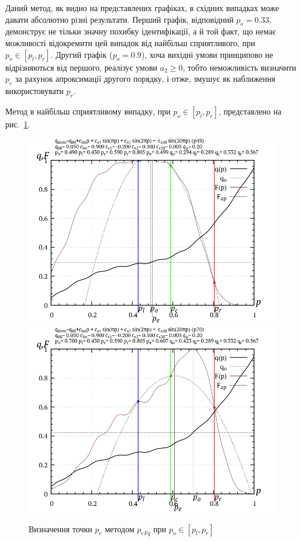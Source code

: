 Даний метод, як видно на представлених графіках, в східних
випадках може давати абсолютно різні результати. Перший графік,
відповідний
$p_o = 0.33$, демонструє не тільки значну похибку ідентифікації,
а й той факт, що немає можливості відокремити цей випадок від
найбільш сприятливого, при
$p_o \in [p_l, p_r]$. Другий графік ($p_o = 0.9$),
хоча вихідні умови принципово не відрізняються від
першого, реалізує умови
$a_2 \ge 0$, тобто неможливість визначити
$p_e$ за рахунок апроксимації другого порядку, і отже, змушує як
наближення використовувати
$p_r$.

Метод в найбільш сприятливому випадку, при
$p_o \in [p_l,p_r]$, представлено на рис.~\ref{atu:f:p_eFq_intra}.


\begin{figure}[htb!]
  \begin{center}
    \includegraphics[width=49\TW]{p/p_eFq/q_p_eFq_p49.png}
    \hfill
    \includegraphics[width=49\TW]{p/p_eFq/q_p_eFq_p70.png}
  \end{center}
  \caption{Визначення точки $p_e$ методом $p_{eFq}$ при $p_o \in [p_l, p_r]$}
  \label{atu:f:p_eFq_intra}
\end{figure}


